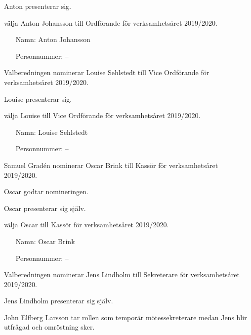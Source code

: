 \documentclass{protokoll}
\begin{document}
Anton presenterar sig.

\begin{beslut}
  \att välja Anton Johansson till Ordförande för verksamhetsåret 2019/2020.
  \begin{itemize}
    \item[Namn: ] Anton Johansson  
    \item[Personnummer: ] \qquad \qquad \qquad \qquad -- \qquad \qquad
  \end{itemize}
\end{beslut}

Valberedningen nominerar Louise Sehlstedt till Vice Ordförande för verksamhetsåret 2019/2020.

Louise presenterar sig.
\begin{beslut}
  \att välja Louise till Vice Ordförande för verksamhetsåret 2019/2020.
  \begin{itemize}
    \item[Namn: ] Louise Sehlstedt
    \item[Personnummer: ] \qquad \qquad \qquad \qquad -- \qquad \qquad
  \end{itemize}
\end{beslut}

Samuel Gradén nominerar Oscar Brink till Kassör för verksamhetsåret 2019/2020. 

Oscar godtar nomineringen. 

Oscar presenterar sig själv.

\begin{beslut}
  \att välja Oscar till Kassör för verksamhetsåret 2019/2020.
  \begin{itemize}
    \item[Namn: ] Oscar Brink 
    \item[Personnummer: ] \qquad \qquad \qquad \qquad -- \qquad \qquad
  \end{itemize}
\end{beslut}

Valberedningen nominerar Jens Lindholm till Sekreterare för verksamhetsåret 2019/2020.

Jens Lindholm presenterar sig själv.

John Elfberg Larsson tar rollen som temporär mötessekreterare medan Jens blir
utfrågad och omröstning sker.

\end{document}
